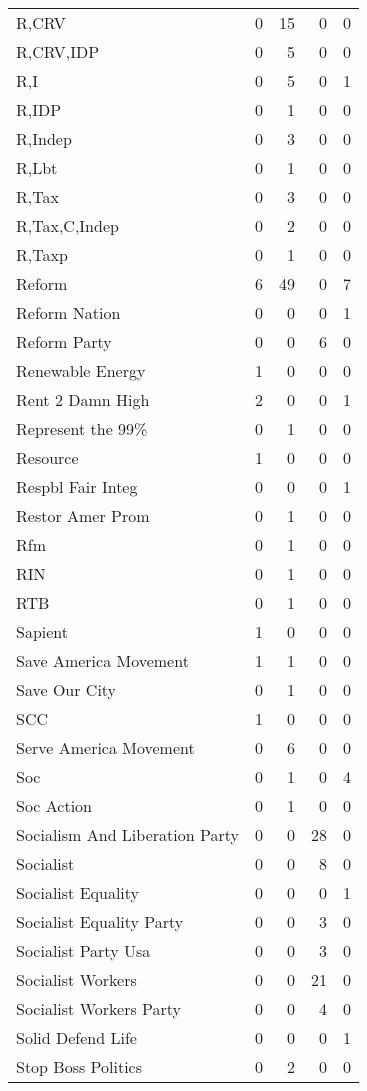 \begin{supertabular}{lrrrr}
R,CRV & 0 & 15 & 0 & 0\\
R,CRV,IDP & 0 & 5 & 0 & 0\\
R,I & 0 & 5 & 0 & 1\\
R,IDP & 0 & 1 & 0 & 0\\
R,Indep & 0 & 3 & 0 & 0\\
R,Lbt & 0 & 1 & 0 & 0\\
R,Tax & 0 & 3 & 0 & 0\\
R,Tax,C,Indep & 0 & 2 & 0 & 0\\
R,Taxp & 0 & 1 & 0 & 0\\
Reform & 6 & 49 & 0 & 7\\
Reform Nation & 0 & 0 & 0 & 1\\
Reform Party & 0 & 0 & 6 & 0\\
Renewable Energy & 1 & 0 & 0 & 0\\
Rent 2 Damn High & 2 & 0 & 0 & 1\\
Represent the 99\% & 0 & 1 & 0 & 0\\
Resource & 1 & 0 & 0 & 0\\
Respbl Fair Integ & 0 & 0 & 0 & 1\\
Restor Amer Prom & 0 & 1 & 0 & 0\\
Rfm & 0 & 1 & 0 & 0\\
RIN & 0 & 1 & 0 & 0\\
RTB & 0 & 1 & 0 & 0\\
Sapient & 1 & 0 & 0 & 0\\
Save America Movement & 1 & 1 & 0 & 0\\
Save Our City & 0 & 1 & 0 & 0\\
SCC & 1 & 0 & 0 & 0\\
Serve America Movement & 0 & 6 & 0 & 0\\
Soc & 0 & 1 & 0 & 4\\
Soc Action & 0 & 1 & 0 & 0\\
Socialism And Liberation Party & 0 & 0 & 28 & 0\\
Socialist & 0 & 0 & 8 & 0\\
Socialist Equality & 0 & 0 & 0 & 1\\
Socialist Equality Party & 0 & 0 & 3 & 0\\
Socialist Party Usa & 0 & 0 & 3 & 0\\
Socialist Workers & 0 & 0 & 21 & 0\\
Socialist Workers Party & 0 & 0 & 4 & 0\\
Solid Defend Life & 0 & 0 & 0 & 1\\
Stop Boss Politics & 0 & 2 & 0 & 0\\

\end{supertabular}
